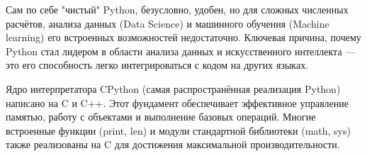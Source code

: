 \documentclass[pract]{SCWorks}
\begin{document}

\date{2026}

\maketitle

\secNumbering

\tableofcontents




\intro


Сам по себе "чистый" Python, безусловно, удобен, но для сложных численных расчётов, анализа данных (Data Science) и 
машинного обучения (Machine learning) его встроенных возможностей недостаточно. Ключевая причина, почему Python стал 
лидером в области анализа данных и искусственного интеллекта — это его способность легко интегрироваться 
с кодом на других языках.

Ядро интерпретатора CPython (самая распространённая реализация Python) написано на C и C++. Этот фундамент обеспечивает 
эффективное управление памятью, работу с объектами и выполнение базовых операций. 
Многие встроенные функции (print, len) и модули стандартной библиотеки (math, sys) также реализованы 
на C для достижения максимальной производительности.
\end{document}
